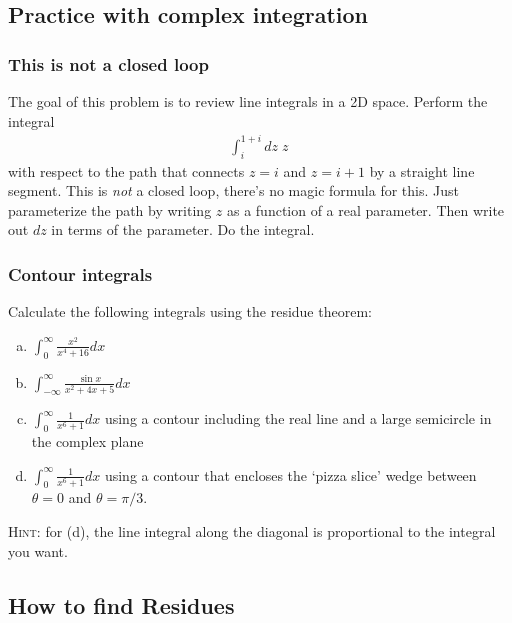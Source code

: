 \documentclass[12pt]{article}
\numberwithin{equation}{subsection}    %
\begin{document}
\subsection{Practice with complex integration}

\subsubsection{This is not a closed loop}

The goal of this problem is to review line integrals in a 2D space. Perform the integral
\begin{align}
	\int_i^{1+i} dz \; z \,
\end{align}
with respect to the path that connects $z=i$ and $z=i+1$ by a straight line segment. This is \emph{not} a closed loop, there's no magic formula for this. Just parameterize the path by writing $z$ as a function of a real parameter. Then write out $dz$ in terms of the parameter. Do the integral.

\subsubsection{Contour integrals}

Calculate the following integrals using the residue theorem:
\begin{enumerate}[(a)]
	\item $\displaystyle \int_{0}^\infty \frac{x^2}{x^4 + 16} dx$ 
	\item $\displaystyle \int_{-\infty}^\infty \frac{\sin x}{x^2 + 4x + 5}dx$ 
	\item $\displaystyle \int_{0}^\infty \frac{1}{x^6+1}dx$ using a contour including the real line and a large semicircle in the complex plane 
	\item $\displaystyle \int_{0}^\infty \frac{1}{x^6+1}dx$ using a contour that encloses the `pizza slice' wedge between $\theta = 0$ and $\theta = \pi/3$. 
\end{enumerate}

\textsc{Hint}: for (d), the line integral along the diagonal is proportional to the integral you want. 




\subsection{How to find Residues}
\end{document}
